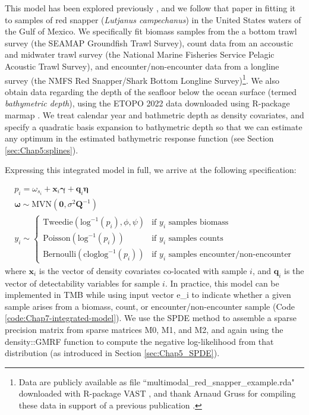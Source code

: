 This model has been explored previously \cite{gruss_developing_2019}, and we follow that paper in fitting it to samples of red snapper (\textit{Lutjanus campechanus}) in the United States waters of the Gulf of Mexico.  We specifically fit biomass samples from the a bottom trawl survey (the SEAMAP Groundfish Trawl Survey), count data from an accoustic and midwater trawl survey (the National Marine Fisheries Service Pelagic Acoustic Trawl Survey), and encounter/non-encounter data from a longline survey (the NMFS Red Snapper/Shark Bottom Longline Survey)\footnote{Data are publicly available as file ``multimodal\_red\_snapper\_example.rda" downloaded with R-package VAST \cite{thorson_guidance_2019}, and thank Arnaud Gruss for compiling these data in support of a previous publication \cite{gruss_developing_2019}.}.  We also obtain data regarding the depth of the seafloor below the ocean surface (termed \textit{bathymetric depth}), using the ETOPO 2022 data \cite{noaa_national_centers_for_environmental_information_etopo_2022} downloaded using R-package \colorbox{backcolour}{marmap} \cite{pante_marmap_2020}.  We treat calendar year and bathmetric depth as density covariates, and specify a quadratic basis expansion to bathymetric depth so that we can estimate any optimum in the estimated bathymetric response function (see Section \ref{sec:Chap5:splines}).     

Expressing this integrated model in full, we arrive at the following specification:

\begin{equation}
\begin{gathered}
  p_i = \omega_{s_i} + \mathbf{x}_i \mathbf{\gamma} + \mathbf{q}_i \mathbf{\eta} \\
  \mathbf{\omega} \sim \mathrm{MVN}( \mathbf{0}, \sigma^2 \mathbf{Q}^{-1} ) \\
  y_i \sim
 \begin{cases}
    \mathrm{Tweedie}( \mathrm{log}^{-1}(p_i), \phi, \psi ) & \text{if } y_i \text{ samples biomass} \\
    \mathrm{Poisson}( \mathrm{log}^{-1}(p_i) ) & \text{if } y_i \text{ samples counts} \\
    \mathrm{Bernoulli}( \mathrm{cloglog}^{-1}(p_i) )  & \text{if } y_i \text{ samples encounter/non-encounter}
  \end{cases}
\end{gathered}
\end{equation}
where \(\mathbf{x}_i\) is the vector of density covariates co-located with sample \(i\), and \(\mathbf{q}_i\) is the vector of detectability variables for sample \(i\).  In practice, this model can be implemented in TMB while using input vector \colorbox{backblue}{e\_i} to indicate whether a given sample arises from a biomass, count, or encounter/non-encounter sample (Code \ref{code:Chap7-integrated-model}). We use the SPDE method to assemble a sparse precision matrix from sparse matrices \colorbox{backblue}{M0}, \colorbox{backblue}{M1}, and \colorbox{backblue}{M2}, and again using the \colorbox{backblue}{density::GMRF} function to compute the negative log-likelihood from that distribution (as introduced in Section \ref{sec:Chap5_SPDE}).  

